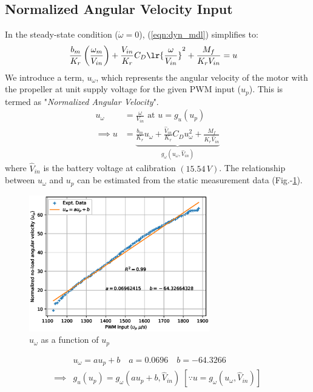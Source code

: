 \subsection{Normalized Angular Velocity Input}
In the steady-state condition ($\dot \omega = 0$), (\ref{eqn:dyn_mdl}) simplifies to:
\begin{align}
    &\frac{b_m}{K_r} \left(\frac{\omega_m}{V_{in}}\right) + \frac{V_{in}}{K_r} C_D \lr{\frac{\omega}{V_{in}}}^2 + \frac{M_f}{K_r V_{in}} = u
\end{align}
We introduce a term, $u_{\omega}$, which represents the angular velocity of the motor with the propeller at unit supply voltage for the given PWM input ($u_p$). This is termed as "\textit{Normalized Angular Velocity}".
\begin{align}
    u_{\omega} &= \frac{\omega}{V_{in}} \text{  at  } u = g_u(u_p) \\
    \implies u &= \underbrace{\frac{b_m}{K_r} u_\omega + \frac{\hat V_{in}}{K_r} C_D u_\omega^2 + \frac{M_f}{K_r  \hat V_{in}}}_{g_\omega (u_\omega, \hat V_{in})}
     \label{eqn::input_def}
\end{align}
where $\hat V_{in}$ is the battery voltage at calibration $(15.54\,V)$.
The relationship between $u_\omega$ and $u_p$ can be estimated from the static
measurement data (Fig.-\ref{fig::norm_omega}).
\begin{figure}[h]
    \centering
    \includegraphics[width = 0.7\textwidth]{Part2/figs/3_figs/norm_omega/no-load_rpm.eps}
    \caption{$u_\omega$ as a function of $u_p$}
    \label{fig::norm_omega}
\end{figure}
\begin{align}
    &u_\omega = a u_p + b
    \quad a = 0.0696
    \quad b = -64.3266\\
    \implies& g_u(u_p) = g_\omega(a u_p  + b, \hat V_{in})
    \; [\because u = g_\omega(u_\omega, \hat V_{in})]
\end{align}
